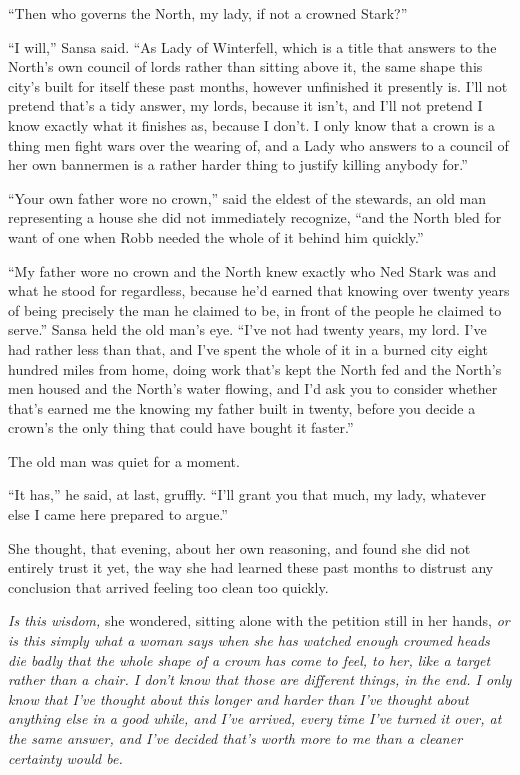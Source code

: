 “Then who governs the North, my lady, if not a crowned Stark?”

“I will,” Sansa said. “As Lady of Winterfell, which is a title that answers to the North’s own council of lords rather than sitting above it, the same shape this city’s built for itself these past months, however unfinished it presently is. I’ll not pretend that’s a tidy answer, my lords, because it isn’t, and I’ll not pretend I know exactly what it finishes as, because I don’t. I only know that a crown is a thing men fight wars over the wearing of, and a Lady who answers to a council of her own bannermen is a rather harder thing to justify killing anybody for.”

\sceneBreak

“Your own father wore no crown,” said the eldest of the stewards, an old man representing a house she did not immediately recognize, “and the North bled for want of one when Robb needed the whole of it behind him quickly.”

“My father wore no crown and the North knew exactly who Ned Stark was and what he stood for regardless, because he’d earned that knowing over twenty years of being precisely the man he claimed to be, in front of the people he claimed to serve.” Sansa held the old man’s eye. “I’ve not had twenty years, my lord. I’ve had rather less than that, and I’ve spent the whole of it in a burned city eight hundred miles from home, doing work that’s kept the North fed and the North’s men housed and the North’s water flowing, and I’d ask you to consider whether that’s earned me the knowing my father built in twenty, before you decide a crown’s the only thing that could have bought it faster.”

The old man was quiet for a moment.

“It has,” he said, at last, gruffly. “I’ll grant you that much, my lady, whatever else I came here prepared to argue.”

\sceneBreak

She thought, that evening, about her own reasoning, and found she did not entirely trust it yet, the way she had learned these past months to distrust any conclusion that arrived feeling too clean too quickly.

\textit{Is this wisdom,} she wondered, sitting alone with the petition still in her hands, \textit{or is this simply what a woman says when she has watched enough crowned heads die badly that the whole shape of a crown has come to feel, to her, like a target rather than a chair. I don’t know that those are different things, in the end. I only know that I’ve thought about this longer and harder than I’ve thought about anything else in a good while, and I’ve arrived, every time I’ve turned it over, at the same answer, and I’ve decided that’s worth more to me than a cleaner certainty would be.}

